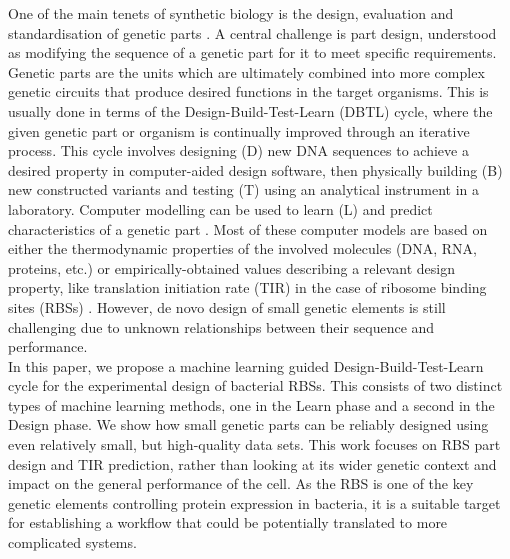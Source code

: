\documentclass{article}
\begin{document}
One of the main tenets of synthetic biology is the design, evaluation and standardisation of genetic parts \cite{Brophy2014,Canton2008,Stanton2014}.
A central challenge is part design, understood as modifying the sequence of a genetic part for it to meet specific requirements.
Genetic parts are the units which are ultimately combined into more complex genetic circuits that produce desired functions in the target organisms.
This is usually done in terms of the Design-Build-Test-Learn (DBTL) cycle, where the given genetic part or organism is continually improved through an iterative process.
This cycle involves designing (D) new DNA sequences to achieve a desired property in computer-aided design software, then physically building (B) new constructed variants and testing (T) using an analytical instrument in a laboratory.
Computer modelling can be used to learn (L) and predict characteristics of a genetic part \cite{Yeoh2019,Nielsen2016}.
Most of these computer models are based on either the thermodynamic properties of the involved molecules (DNA, RNA, proteins, etc.) or empirically-obtained values describing a relevant design property, like translation initiation rate (TIR) in the case of ribosome binding sites (RBSs) \cite{Xia1998,Chen2013,Reeve2014}.
However, de novo design of small genetic elements is still challenging due to unknown relationships between their sequence and performance.\\

In this paper, we propose a machine learning guided Design-Build-Test-Learn cycle
for the experimental design of bacterial RBSs. This consists of two distinct
types of machine learning methods, one in the Learn phase and a second in the
Design phase.
We show how small genetic parts can be reliably designed using even relatively small, but high-quality data sets.
This work focuses on RBS part design and TIR prediction, rather than looking at its wider genetic context and impact on the general performance of the cell.
As the RBS is one of the key genetic elements controlling protein expression in bacteria,
it is a suitable target for establishing a workflow that could be potentially translated to more complicated systems.\\
\end{document}
